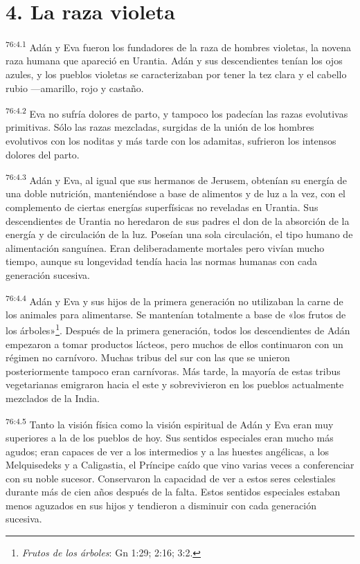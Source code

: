 \section*{4. La raza violeta}
\par
\textsuperscript{76:4.1} Adán y Eva fueron los fundadores de la raza de hombres violetas, la novena raza humana que apareció en Urantia. Adán y sus descendientes tenían los ojos azules, y los pueblos violetas se caracterizaban por tener la tez clara y el cabello rubio ---amarillo, rojo y castaño.

\par
\textsuperscript{76:4.2} Eva no sufría dolores de parto, y tampoco los padecían las razas evolutivas primitivas. Sólo las razas mezcladas, surgidas de la unión de los hombres evolutivos con los noditas y más tarde con los adamitas, sufrieron los intensos dolores del parto.

\par
\textsuperscript{76:4.3} Adán y Eva, al igual que sus hermanos de Jerusem, obtenían su energía de una doble nutrición, manteniéndose a base de alimentos y de luz a la vez, con el complemento de ciertas energías superfísicas no reveladas en Urantia. Sus descendientes de Urantia no heredaron de sus padres el don de la absorción de la energía y de circulación de la luz. Poseían una sola circulación, el tipo humano de alimentación sanguínea. Eran deliberadamente mortales pero vivían mucho tiempo, aunque su longevidad tendía hacia las normas humanas con cada generación sucesiva.

\par
\textsuperscript{76:4.4} Adán y Eva y sus hijos de la primera generación no utilizaban la carne de los animales para alimentarse. Se mantenían totalmente a base de «los frutos de los árboles»\footnote{\textit{Frutos de los árboles}: Gn 1:29; 2:16; 3:2.}. Después de la primera generación, todos los descendientes de Adán empezaron a tomar productos lácteos, pero muchos de ellos continuaron con un régimen no carnívoro. Muchas tribus del sur con las que se unieron posteriormente tampoco eran carnívoras. Más tarde, la mayoría de estas tribus vegetarianas emigraron hacia el este y sobrevivieron en los pueblos actualmente mezclados de la India.

\par
\textsuperscript{76:4.5} Tanto la visión física como la visión espiritual de Adán y Eva eran muy superiores a la de los pueblos de hoy. Sus sentidos especiales eran mucho más agudos; eran capaces de ver a los intermedios y a las huestes angélicas, a los Melquisedeks y a Caligastia, el Príncipe caído que vino varias veces a conferenciar con su noble sucesor. Conservaron la capacidad de ver a estos seres celestiales durante más de cien años después de la falta. Estos sentidos especiales estaban menos aguzados en sus hijos y tendieron a disminuir con cada generación sucesiva.

